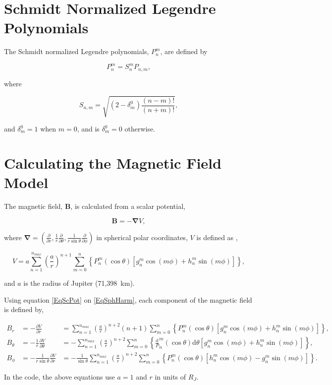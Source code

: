 \documentclass[]{article}
\begin{document}
\section{Schmidt Normalized Legendre Polynomials}
	
	The Schmidt normalized Legendre polynomials, $P_n^m$, are defined by
	
	\begin{equation}
		P_n^m = S_n^m P_{n,m},
	\end{equation}
	
	where 
	
	\begin{equation}
		S_{n,m} = \sqrt{(2-\delta_m^0)\frac{(n-m)!}{(n+m)!}},
	\end{equation}
	
	and $\delta_m^0 = 1$ when $m = 0$, and is $\delta_m^0 = 0$ otherwise.
	
\section{Calculating the Magnetic Field Model}

	The magnetic field, $\mathbf{B}$, is calculated from a scalar potential,
	
	\begin{equation}
		\mathbf{B} = -\mathbf{\nabla} V, \label{EqScPot}
	\end{equation}
	
	where $\mathbf{\nabla} = \left(\frac{\partial}{\partial r},\frac{1}{r}\frac{\partial}{\partial \theta},\frac{1}{r \sin{\theta}} \frac{\partial}{\partial \phi} \right) $ in spherical polar coordinates, $V$ is defined as \cite[e.g.][]{Connerney1998,Winch2005},
	
	\begin{equation}
		V = a\sum_{n=1}^{n_{max}} \left(\frac{a}{r}\right)^{n+1} \sum_{m=0}^{n} \left\{P_n^m(\cos{\theta}) \left[g_n^m \cos{(m\phi)} + h_n^m\sin{(m\phi)}\right]\right\}, \label{EqSphHarm}
	\end{equation}
	
	and $a$ is the radius of Jupiter (71,398~km).
	
	Using equation \ref{EqScPot} on \ref{EqSphHarm}, each component of the magnetic field is defined by,
	
	\begin{align}
		B_r &= -\frac{\partial V}{\partial r} &= \sum_{n=1}^{n_{max}} \left(\frac{a}{r}\right)^{n+2} (n+1) \sum_{m=0}^{n} \left\{P_n^m(\cos{\theta}) \left[g_n^m \cos{(m\phi)} + h_n^m\sin{(m\phi)}\right]\right\}, \\
		B_\theta &= -\frac{1}{r}\frac{\partial V}{\partial \theta} &= -\sum_{n=1}^{n_{max}} \left(\frac{a}{r}\right)^{n+2} \sum_{m=0}^{n} \left\{\frac{\text{d}} P_n^m(\cos{\theta}){\text{d}\theta} \left[g_n^m \cos{(m\phi)} + h_n^m\sin{(m\phi)}\right]\right\}, \\
		B_\phi &= -\frac{1}{r\sin{\theta}}\frac{\partial V}{\partial r} &= -\frac{1}{\sin{\theta}}\sum_{n=1}^{n_{max}} \left(\frac{a}{r}\right)^{n+2} \sum_{m=0}^{n} \left\{P_n^m(\cos{\theta}) \left[h_n^m \cos{(m\phi)} - g_n^m\sin{(m\phi)}\right]\right\}.
	\end{align}
	
	In the code, the above equations use $a =1$ and $r$ in units of $R_J$.
	


\end{document}

